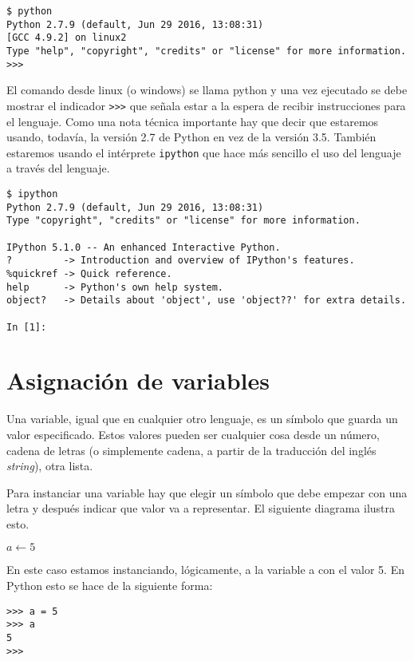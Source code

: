 \documentclass{report}
\newcommand{\pythonprompt}{\textgreater\textgreater\textgreater}
\begin{document}
\begin{verbatim}
$ python
Python 2.7.9 (default, Jun 29 2016, 13:08:31) 
[GCC 4.9.2] on linux2
Type "help", "copyright", "credits" or "license" for more information.
>>> 
\end{verbatim}

El comando desde linux (o windows) se llama python y una vez ejecutado se
debe mostrar el indicador {\tt{\pythonprompt}} que señala estar a la espera de 
recibir instrucciones para el lenguaje. Como una nota técnica importante hay 
que decir que estaremos usando, todavía, la versión 2.7 de Python en vez de la 
versión 3.5. También estaremos usando el intérprete {\tt{ipython}} que hace 
más sencillo el uso del lenguaje a través del lenguaje.

\begin{verbatim}
$ ipython
Python 2.7.9 (default, Jun 29 2016, 13:08:31) 
Type "copyright", "credits" or "license" for more information.

IPython 5.1.0 -- An enhanced Interactive Python.
?         -> Introduction and overview of IPython's features.
%quickref -> Quick reference.
help      -> Python's own help system.
object?   -> Details about 'object', use 'object??' for extra details.

In [1]: 
\end{verbatim}

\section{Asignación de variables}

Una variable, igual que en cualquier otro lenguaje, es un símbolo que guarda
un valor especificado. Estos valores pueden ser cualquier cosa desde un número,
cadena de letras (o simplemente cadena, a partir de la traducción del inglés 
{\it{string}}), otra lista.

Para instanciar una variable hay que elegir un símbolo que debe empezar con una
letra y después indicar que valor va a representar. El siguiente diagrama 
ilustra esto.

\begin{algorithmic}
\State $a \gets 5$
\end{algorithmic}

En este caso estamos instanciando, lógicamente, a la variable a con el valor 5. En Python esto se hace de la siguiente forma:

\begin{verbatim}
>>> a = 5
>>> a
5
>>> 
\end{verbatim}
\end{document}
